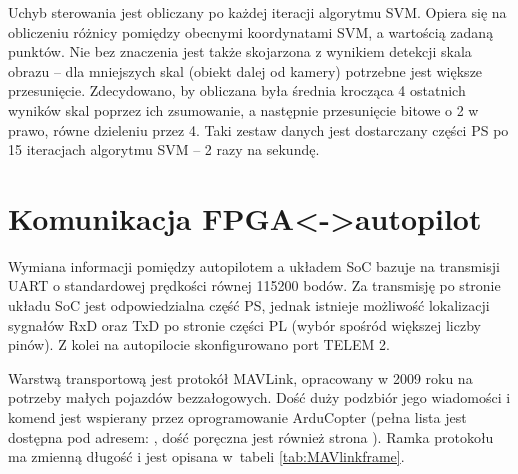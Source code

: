 Uchyb sterowania jest obliczany po każdej iteracji algorytmu SVM. 
Opiera się na obliczeniu różnicy pomiędzy obecnymi koordynatami SVM, a wartością zadaną punktów. %
Nie bez znaczenia jest także skojarzona z wynikiem detekcji skala obrazu -- dla mniejszych skal (obiekt dalej od kamery) potrzebne jest większe przesunięcie. 
Zdecydowano, by obliczana była średnia krocząca 4 ostatnich wyników skal poprzez ich zsumowanie, a następnie przesunięcie bitowe o 2 w prawo, równe dzieleniu przez 4. 
Taki zestaw danych jest dostarczany części PS po 15 iteracjach algorytmu SVM -- 2 razy na sekundę.


\section{Komunikacja FPGA<->autopilot} %

Wymiana informacji pomiędzy autopilotem a układem SoC bazuje na transmisji UART o standardowej prędkości równej 115200 bodów. 
Za transmisję po stronie układu SoC jest odpowiedzialna część PS, jednak istnieje możliwość lokalizacji sygnałów RxD oraz TxD po stronie części PL (wybór spośród większej liczby pinów). 
Z kolei na autopilocie skonfigurowano port TELEM 2.

Warstwą transportową jest protokół MAVLink, opracowany w 2009 roku na potrzeby małych pojazdów bezzałogowych. 
Dość duży podzbiór jego wiadomości i komend jest wspierany przez oprogramowanie ArduCopter (pełna lista jest dostępna pod adresem: \cite{ArduCopterCmds}, dość poręczna jest również strona \cite{MAVLinkMSG}). 
Ramka protokołu ma zmienną długość i jest opisana w~tabeli \ref{tab:MAVlinkframe}.

